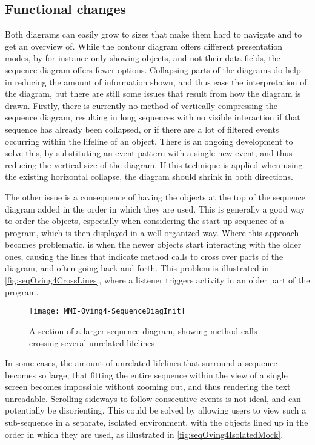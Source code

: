 \subsection{Functional changes}\label{jiveSuggestionsFunctional}
Both diagrams can easily grow to sizes that make them hard to navigate and to get an overview of.
While the contour diagram offers different presentation modes, by for instance only showing objects, and not their data-fields, the sequence diagram offers fewer options.
Collapsing parts of the diagrams do help in reducing the amount of information shown, and thus ease the interpretation of the diagram, but there are still some issues that result from how the diagram is drawn.
Firstly, there is currently no method of vertically compressing the sequence diagram, resulting in long sequences with no visible interaction if that sequence has already been collapsed, or if there are a lot of filtered events occurring within the lifeline of an object.
There is an ongoing development to solve this, by substituting an event-pattern with a single new event, and thus reducing the vertical size of the diagram.
If this technique is applied when using the existing horizontal collapse, the diagram should shrink in both directions.


The other issue is a consequence of having the objects at the top of the sequence diagram added in the order in which they are used.
This is generally a good way to order the objects, especially when considering the start-up sequence of a program, which is then displayed in a well organized way.
Where this approach becomes problematic, is when the newer objects start interacting with the older ones, causing the lines that indicate method calls to cross over parts of the diagram, and often going back and forth.
This problem is illustrated in \autoref{fig:seqOving4CrossLines}, where a listener triggers activity in an older part of the program.


\begin{figure}[H]
	\centering
	\texttt{[image: MMI-Oving4-SequenceDiagInit]}
	\caption{A section of a larger sequence diagram, showing method calls crossing several unrelated lifelines}
	\label{fig:seqOving4CrossLines}
\end{figure}


In some cases, the amount of unrelated lifelines that surround a sequence becomes so large, that fitting the entire sequence within the view of a single screen becomes impossible without zooming out, and thus rendering the text unreadable.
Scrolling sideways to follow consecutive events is not ideal, and can potentially be disorienting.
This could be solved by allowing users to view such a sub-sequence in a separate, isolated environment, with the objects lined up in the order in which they are used, as illustrated in \autoref{fig:seqOving4IsolatedMock}.


